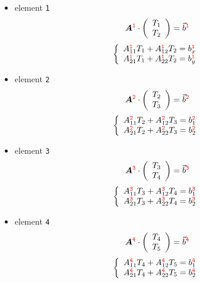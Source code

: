 \begin{itemize}
\item element {\color{red}\tt 1} 
\[
{\bm A}^{\color{red} \tt 1}  \cdot 
\left(
\begin{array}{c}
T_1 \\ T_2
\end{array}
\right)
 =  {\vec b}^{\color{red} \tt 1}
\]
\[
\left\{ 
\begin{array}{l}
A_{11}^{{\color{red}\tt 1}} T_1 + A_{12}^{{\color{red}\tt 1}} T_2 = b^{{\color{red} \tt 1}}_x \\
A_{21}^{{\color{red}\tt 1}} T_1 + A_{22}^{{\color{red}\tt 1}} T_2 = b^{{\color{red} \tt 1}}_y
\end{array}
\right.
\]

\item element {\color{red}\tt 2} 
\[
{\bm A}^{\color{red} \tt 2}  \cdot 
\left(
\begin{array}{c}
T_2 \\ T_3
\end{array}
\right)
 =  {\vec b}^{\color{red} \tt 2}
\]
\[
\left\{ 
\begin{array}{l}
A_{11}^{{\color{red}\tt 2}} T_2 + A_{12}^{{\color{red}\tt 2}} T_3 = b^{{\color{red} \tt 2}}_1 \\
A_{21}^{{\color{red}\tt 2}} T_2 + A_{22}^{{\color{red}\tt 2}} T_3 = b^{{\color{red} \tt 2}}_2
\end{array}
\right.
\]


\item element {\color{red}\tt 3} 
\[
{\bm A}^{\color{red} \tt 3}  \cdot 
\left(
\begin{array}{c}
T_3 \\ T_4
\end{array}
\right)
 =  {\vec b}^{\color{red} \tt 3}
\]
\[
\left\{ 
\begin{array}{l}
A_{11}^{{\color{red}\tt 3}} T_3 + A_{12}^{{\color{red} \tt 3}} T_4 = b^{{\color{red} \tt 3}}_1 \\
A_{21}^{{\color{red}\tt 3}} T_3 + A_{22}^{{\color{red} \tt 3}} T_4 = b^{{\color{red} \tt 3}}_2
\end{array}
\right.
\]


\item element {\color{red}\tt 4} 
\[
{\bm A}^{\color{red} \tt 4}  \cdot 
\left(
\begin{array}{c}
T_4 \\ T_5
\end{array}
\right)
 =  {\vec b}^{\color{red} \tt 4}
\]
\[
\left\{ 
\begin{array}{l}
A_{11}^{{\color{red}\tt 4}} T_4 + A_{12}^{{\color{red}\tt 4}} T_5 = b^{{\color{red}\tt 4}}_1 \\
A_{21}^{{\color{red}\tt 4}} T_4 + A_{22}^{{\color{red}\tt 4}} T_5 = b^{{\color{red}\tt 4}}_2
\end{array}
\right.
\]
\end{itemize}

